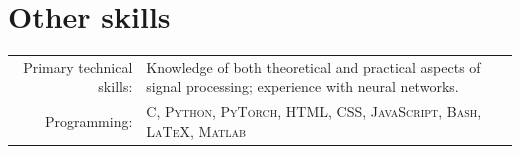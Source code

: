 \documentclass[a4paper,10pt]{article}
\begin{document}
  \section{Other skills}

  \begin{tabular}{rp{11cm}}
	Primary technical skills:  & Knowledge of both theoretical and practical aspects of signal processing; experience with neural networks.
  \vspace{5pt}\\
	Programming:       &  \textsc{C, Python, PyTorch, HTML, CSS, JavaScript, Bash, \LaTeX, Matlab}  \vspace{5pt}\\

  \end{tabular}

\end{document}
